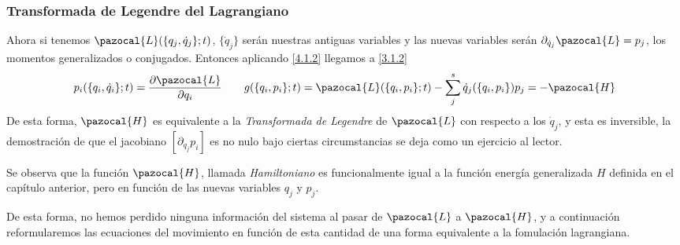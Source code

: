 \subsubsection{Transformada de Legendre del Lagrangiano}
Ahora si tenemos $\pazocal{L}(\{q_j,\dot{q}_j\};t)$, $\{\dot{q}_j\}$ serán nuestras antiguas variables y las nuevas variables serán $\partial_{\dot{q}_j}\pazocal{L}=p_j$, los momentos generalizados o conjugados. Entonces aplicando \eqref{4.1.2} llegamos a \eqref{3.1.2}
\begin{equation} \label{4.1.3}
        p_i(\{q_i,\dot{q}_i\};t)=\frac{\partial \pazocal{L}}{\partial q_i} \ \ \ \ \ \  g(\{q_i,p_i\};t) =\pazocal{L}(\{q_i,p_i\};t) -\sum_j^s \dot{q}_j (\{q_i,p_i\}) p_j = -\pazocal{H}
\end{equation} 
De esta forma, $\pazocal{H}$ es equivalente a la \textit{Transformada de Legendre} de $\pazocal{L}$ con respecto a los $\dot{q}_j$, y esta es inversible, la demostración de que el jacobiano $[\partial_{\dot{q}_j}p_i]$ es no nulo bajo ciertas circumstancias se deja como un ejercicio al lector.

Se observa que la función $\pazocal{H}$, llamada \textit{Hamiltoniano} es funcionalmente igual a la función energía generalizada $H$ definida en el capítulo anterior, pero en función de las nuevas variables $q_j$ y $p_j$.

De esta forma, no hemos perdido ninguna información del sistema al pasar de $\pazocal{L}$ a $\pazocal{H}$, y a continuación reformularemos las ecuaciones del movimiento en función de esta cantidad de una forma equivalente a la fomulación lagrangiana.
